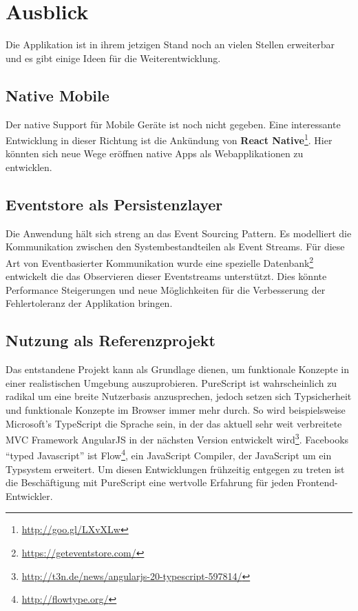 \section{Ausblick}
Die Applikation ist in ihrem jetzigen Stand noch an vielen Stellen
erweiterbar und es gibt einige Ideen für die Weiterentwicklung.

\subsection{Native Mobile}
Der native Support für Mobile Geräte ist noch nicht gegeben. Eine
interessante Entwicklung in dieser Richtung ist die Ankündung von
\textbf{React Native}\footnote{\url{http://goo.gl/LXvXLw}}.
Hier könnten sich neue Wege eröffnen native Apps als Webapplikationen
zu entwicklen.

\subsection{Eventstore als Persistenzlayer}
Die Anwendung hält sich streng an das \gls{Event Sourcing} Pattern. Es
modelliert die Kommunikation zwischen den Systembestandteilen als Event
Streams. Für diese Art von Eventbasierter Kommunikation wurde eine spezielle
Datenbank\footnote{\url{https://geteventstore.com/}} entwickelt die
das Observieren dieser Eventstreams unterstützt. Dies könnte
Performance Steigerungen und neue Möglichkeiten für die Verbesserung
der Fehlertoleranz der Applikation bringen.

\subsection{Nutzung als Referenzprojekt}
Das entstandene Projekt kann als Grundlage dienen, um
funktionale Konzepte in einer realistischen Umgebung auszuprobieren.
PureScript ist wahrscheinlich zu radikal um eine breite Nutzerbasis
anzusprechen, jedoch setzen sich Typsicherheit und funktionale
Konzepte im Browser immer mehr durch. So wird beispielsweise Microsoft's
TypeScript die Sprache sein, in der das aktuell sehr weit verbreitete MVC
Framework AngularJS in der nächsten Version entwickelt wird\footnote{\url{http://t3n.de/news/angularjs-20-typescript-597814/}}.
Facebooks ``typed Javascript'' ist
Flow\footnote{\url{http://flowtype.org/}}, ein JavaScript Compiler, der
JavaScript um ein Typsystem erweitert. Um diesen Entwicklungen
frühzeitig entgegen zu treten ist die Beschäftigung mit PureScript
eine wertvolle Erfahrung für jeden Frontend-Entwickler.


